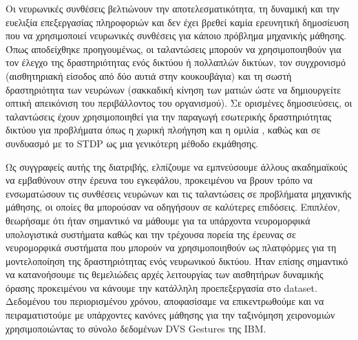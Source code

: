 \documentclass[12pt]{report}
\begin{document}
Οι νευρωνικές συνθέσεις βελτιώνουν την αποτελεσματικότητα, τη δυναμική και την ευελιξία επεξεργασίας πληροφοριών και δεν έχει βρεθεί καμία ερευνητική δημοσίευση που να χρησιμοποιεί νευρωνικές συνθέσεις για κάποιο πρόβλημα μηχανικής μάθησης. Όπως αποδείχθηκε προηγουμένως, οι ταλαντώσεις μπορούν να χρησιμοποιηθούν για τον έλεγχο της δραστηριότητας ενός δικτύου ή πολλαπλών δικτύων, τον συγχρονισμό (αισθητηριακή είσοδος από δύο αυτιά στην κουκουβάγια) και τη σωστή δραστηριότητα των νευρώνων (σακκαδική κίνηση των ματιών ώστε να δημιουργείτε οπτική απεικόνιση του περιβάλλοντος του οργανισμού). Σε ορισμένες δημοσιεύσεις, οι ταλαντώσεις έχουν χρησιμοποιηθεί για την παραγωγή εσωτερικής δραστηριότητας δικτύου για προβλήματα όπως η χωρική πλοήγηση και η ομιλία \cite{vincent2020}, καθώς και σε συνδυασμό με το \textlatin{STDP} \cite{deco2009} ως μια γενικότερη μέθοδο εκμάθησης.

Ως συγγραφείς αυτής της διατριβής, ελπίζουμε να εμπνεύσουμε άλλους ακαδημαϊκούς να εμβαθύνουν στην έρευνα του εγκεφάλου, προκειμένου να βρουν τρόπο να ενσωματώσουν τις συνθέσεις νευρώνων και τις ταλαντώσεις σε προβλήματα μηχανικής μάθησης, οι οποίες θα μπορούσαν να οδηγήσουν σε καλύτερες επιδόσεις. Επιπλέον, θεωρήσαμε ότι ήταν σημαντικό να μάθουμε για τα υπάρχοντα νευρομορφικά υπολογιστικά συστήματα καθώς και την τρέχουσα πορεία της έρευνας σε νευρομορφικά συστήματα που μπορούν να χρησιμοποιηθούν ως πλατφόρμες για τη μοντελοποίηση της δραστηριότητας ενός νευρωνικού δικτύου. Ήταν επίσης σημαντικό να κατανοήσουμε τις θεμελιώδεις αρχές λειτουργίας των αισθητήρων δυναμικής όρασης προκειμένου να κάνουμε την κατάλληλη προεπεξεργασία στο \textlatin{dataset}. Δεδομένου του περιορισμένου χρόνου, αποφασίσαμε να επικεντρωθούμε και να πειραματιστούμε με υπάρχοντες κανόνες μάθησης για την ταξινόμηση χειρονομιών χρησιμοποιώντας το σύνολο δεδομένων \textlatin{DVS Gestures} της \textlatin{IBM}.


\end{document}
